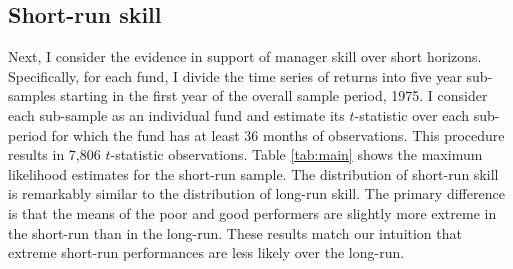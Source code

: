 	\subsection{Short-run skill}
		Next, I consider the evidence in support of manager skill over short horizons. Specifically, for each fund, I divide the time series of returns into five year sub-samples starting in the first year of the overall sample period, 1975. I consider each sub-sample as an individual fund and estimate its $t$-statistic over each sub-period for which the fund has at least 36 months of observations. This procedure results in 7,806 $t$-statistic observations. Table \ref{tab:main} shows the maximum likelihood estimates for the short-run sample. The distribution of short-run skill is remarkably similar to the distribution of long-run skill. The primary difference is that the means of the poor and good performers are slightly more extreme in the short-run than in the long-run. These results match our intuition that extreme short-run performances are less likely over the long-run.

